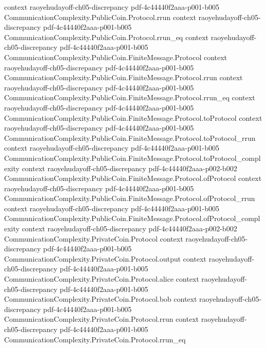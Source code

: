 \begin{lemma}
  {context}
  {raoyehudayoff-ch05-discrepancy}
  {pdf-4c44440f2aaa-p001-b005}
\proofstep
  {CommunicationComplexity.PublicCoin.Protocol.rrun}
  {context}
  {raoyehudayoff-ch05-discrepancy}
  {pdf-4c44440f2aaa-p001-b005}
\proofstep
  {CommunicationComplexity.PublicCoin.Protocol.rrun_eq}
  {context}
  {raoyehudayoff-ch05-discrepancy}
  {pdf-4c44440f2aaa-p001-b005}
\proofstep
  {CommunicationComplexity.PublicCoin.FiniteMessage.Protocol}
  {context}
  {raoyehudayoff-ch05-discrepancy}
  {pdf-4c44440f2aaa-p001-b005}
\proofstep
  {CommunicationComplexity.PublicCoin.FiniteMessage.Protocol.rrun}
  {context}
  {raoyehudayoff-ch05-discrepancy}
  {pdf-4c44440f2aaa-p001-b005}
\proofstep
  {CommunicationComplexity.PublicCoin.FiniteMessage.Protocol.rrun_eq}
  {context}
  {raoyehudayoff-ch05-discrepancy}
  {pdf-4c44440f2aaa-p001-b005}
\proofstep
  {CommunicationComplexity.PublicCoin.FiniteMessage.Protocol.toProtocol}
  {context}
  {raoyehudayoff-ch05-discrepancy}
  {pdf-4c44440f2aaa-p001-b005}
\proofstep
  {CommunicationComplexity.PublicCoin.FiniteMessage.Protocol.toProtocol_rrun}
  {context}
  {raoyehudayoff-ch05-discrepancy}
  {pdf-4c44440f2aaa-p001-b005}
\proofstep
  {CommunicationComplexity.PublicCoin.FiniteMessage.Protocol.toProtocol_complexity}
  {context}
  {raoyehudayoff-ch05-discrepancy}
  {pdf-4c44440f2aaa-p002-b002}
\proofstep
  {CommunicationComplexity.PublicCoin.FiniteMessage.Protocol.ofProtocol}
  {context}
  {raoyehudayoff-ch05-discrepancy}
  {pdf-4c44440f2aaa-p001-b005}
\proofstep
  {CommunicationComplexity.PublicCoin.FiniteMessage.Protocol.ofProtocol_rrun}
  {context}
  {raoyehudayoff-ch05-discrepancy}
  {pdf-4c44440f2aaa-p001-b005}
\proofstep
  {CommunicationComplexity.PublicCoin.FiniteMessage.Protocol.ofProtocol_complexity}
  {context}
  {raoyehudayoff-ch05-discrepancy}
  {pdf-4c44440f2aaa-p002-b002}
\proofstep
  {CommunicationComplexity.PrivateCoin.Protocol}
  {context}
  {raoyehudayoff-ch05-discrepancy}
  {pdf-4c44440f2aaa-p001-b005}
\proofstep
  {CommunicationComplexity.PrivateCoin.Protocol.output}
  {context}
  {raoyehudayoff-ch05-discrepancy}
  {pdf-4c44440f2aaa-p001-b005}
\proofstep
  {CommunicationComplexity.PrivateCoin.Protocol.alice}
  {context}
  {raoyehudayoff-ch05-discrepancy}
  {pdf-4c44440f2aaa-p001-b005}
\proofstep
  {CommunicationComplexity.PrivateCoin.Protocol.bob}
  {context}
  {raoyehudayoff-ch05-discrepancy}
  {pdf-4c44440f2aaa-p001-b005}
\proofstep
  {CommunicationComplexity.PrivateCoin.Protocol.rrun}
  {context}
  {raoyehudayoff-ch05-discrepancy}
  {pdf-4c44440f2aaa-p001-b005}
\proofstep
  {CommunicationComplexity.PrivateCoin.Protocol.rrun_eq}

\end{lemma}
